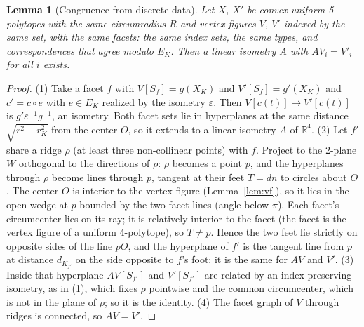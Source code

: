 \documentclass[11pt]{article}
\newtheorem{lemma}[theorem]{Lemma}
\theoremstyle{definition}
\theoremstyle{remark}
\newcommand{\R}{\mathbb{R}}
\begin{document}
\begin{appendices}
\label{sec:S3}
\begin{lemma}[Congruence from discrete data]\label{lem:D}
Let $X$, $X'$ be convex uniform 5-polytopes with the same circumradius $R$
and vertex figures $V$, $V'$ indexed by the same set, with the same facets:
the same index sets, the same types, and correspondences that agree
modulo $E_K$. Then a linear isometry $A$ with $AV_i=V'_i$ for all $i$
exists.
\end{lemma}
\begin{proof}
(1) Take a facet $f$ with $V[S_f]=g(X_K)$ and $V'[S_f]=g'(X_K)$ and
$c'=c\circ e$ with $e\in E_K$ realized by the isometry $\varepsilon$. Then
$V[c(t)]\mapsto V'[c(t)]$ is $g'\varepsilon^{-1}g^{-1}$, an isometry. Both
facet sets lie in hyperplanes at the same distance $\sqrt{r^2-r_K^2}$ from
the center $O$, so it extends to a linear isometry $A$ of $\R^4$.
(2) Let $f'$ share a ridge $\rho$ (at least three non-collinear points)
with $f$. Project to the 2-plane $W$ orthogonal to the directions of
$\rho$: $\rho$ becomes a point $p$, and the hyperplanes through $\rho$
become lines through $p$, tangent at their feet $T=dn$ to circles about
$O$. The center $O$ is interior to the vertex figure (Lemma~\ref{lem:vf}),
so it lies in the open wedge at $p$ bounded by the two facet lines (angle
below $\pi$). Each facet's circumcenter lies on its ray; it is relatively
interior to the facet (the facet is the vertex figure of a uniform
4-polytope), so $T\ne p$. Hence the two feet lie strictly on opposite
sides of the line $pO$, and the hyperplane of $f'$ is the tangent line from
$p$ at distance $d_{K_{f'}}$ on the side opposite to $f$'s foot; it is the
same for $AV$ and $V'$. (3) Inside that hyperplane $AV[S_{f'}]$ and
$V'[S_{f'}]$ are related by an index-preserving isometry, as in (1), which
fixes $\rho$ pointwise and the common circumcenter, which is not in the
plane of $\rho$; so it is the identity. (4) The facet graph of $V$ through
ridges is connected, so $AV=V'$.
\end{proof}



\end{appendices}
\end{document}
